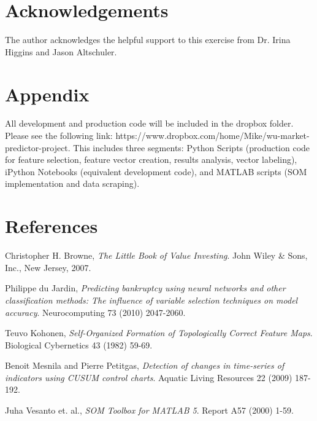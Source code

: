 \documentclass[preprint,12pt]{elsarticle}
\begin{document}

\section*{Acknowledgements}
The author acknowledges the helpful support to this exercise from Dr. Irina Higgins and Jason Altschuler.

\section*{Appendix}
All development and production code will be included in the dropbox folder. Please see the following link: https://www.dropbox.com/home/Mike/wu-market-predictor-project. This includes three segments: Python Scripts (production code for feature selection, feature vector creation, results analysis, vector labeling), iPython Notebooks (equivalent development code), and MATLAB scripts (SOM implementation and data scraping).



% 
% 


\section*{References}
\begin{thebibliography}{00}

  Christopher H. Browne,
  \emph{The Little Book of Value Investing}.
  John Wiley \& Sons, Inc., New Jersey,
  2007.
  
  Philippe du Jardin,
  \emph{Predicting bankruptcy using neural networks and other classification methods: The influence of variable selection techniques on model accuracy}.
  Neurocomputing 73 (2010) 2047-2060.

  Teuvo Kohonen,
  \emph{Self-Organized Formation of Topologically Correct Feature Maps}.
  Biological Cybernetics 43 (1982) 59-69.

  Benoit Mesnila and Pierre Petitgas,
  \emph{Detection of changes in time-series of indicators using CUSUM control charts}.
  Aquatic Living Resources 22 (2009) 187-192.
  
  Juha Vesanto et. al.,
  \emph{SOM Toolbox for MATLAB 5}.
  Report A57 (2000) 1-59. 
\end{thebibliography}
\end{document}
